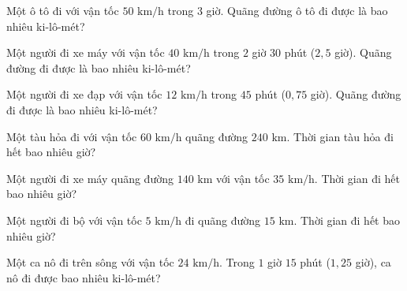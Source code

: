 
\begin{ex}
  Một ô tô đi với vận tốc $50\text{ km/h}$ trong $3$ giờ. Quãng đường ô tô đi được là bao nhiêu ki-lô-mét?
\end{ex}

\begin{ex}
  Một người đi xe máy với vận tốc $40\text{ km/h}$ trong $2$ giờ $30$ phút ($2{,}5$ giờ). Quãng đường đi được là bao nhiêu ki-lô-mét?
\end{ex}

\begin{ex}
  Một người đi xe đạp với vận tốc $12\text{ km/h}$ trong $45$ phút ($0{,}75$ giờ). Quãng đường đi được là bao nhiêu ki-lô-mét?
\end{ex}

\begin{ex}
  Một tàu hỏa đi với vận tốc $60\text{ km/h}$ quãng đường $240\text{ km}$. Thời gian tàu hỏa đi hết bao nhiêu giờ?
\end{ex}

\begin{ex}
  Một người đi xe máy quãng đường $140\text{ km}$ với vận tốc $35\text{ km/h}$. Thời gian đi hết bao nhiêu giờ?
\end{ex}

\begin{ex}
  Một người đi bộ với vận tốc $5\text{ km/h}$ đi quãng đường $15\text{ km}$. Thời gian đi hết bao nhiêu giờ?
\end{ex}

\begin{ex}
  Một ca nô đi trên sông với vận tốc $24\text{ km/h}$. Trong $1$ giờ $15$ phút ($1{,}25$ giờ), ca nô đi được bao nhiêu ki-lô-mét?
\end{ex}

